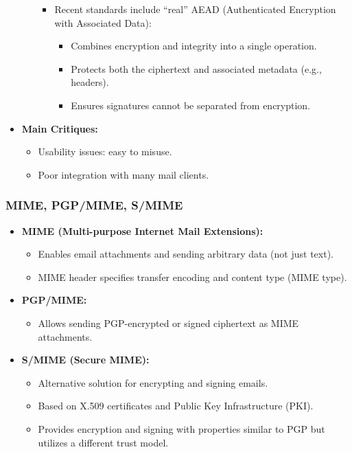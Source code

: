 \begin{itemize}
\begin{itemize}
\begin{itemize}
\begin{itemize}
            \end{itemize}
            \item Recent standards include ``real'' AEAD (Authenticated Encryption with Associated Data):
            \begin{itemize}
                \item Combines encryption and integrity into a single operation.
                \item Protects both the ciphertext and associated metadata (e.g., headers).
                \item Ensures signatures cannot be separated from encryption.
            \end{itemize}
        \end{itemize}
    \end{itemize}
    
    \item \textbf{Main Critiques:}
    \begin{itemize}
        \item Usability issues: easy to misuse.
        \item Poor integration with many mail clients.
    \end{itemize}
\end{itemize}

\subsubsection{MIME, PGP/MIME, S/MIME}
\begin{itemize}
    \item \textbf{MIME (Multi-purpose Internet Mail Extensions):}
    \begin{itemize}
        \item Enables email attachments and sending arbitrary data (not just text).
        \item MIME header specifies transfer encoding and content type (MIME type).
    \end{itemize}
    \item \textbf{PGP/MIME:}
    \begin{itemize}
        \item Allows sending PGP-encrypted or signed ciphertext as MIME attachments.
    \end{itemize}
    \item \textbf{S/MIME (Secure MIME):}
    \begin{itemize}
        \item Alternative solution for encrypting and signing emails.
        \item Based on X.509 certificates and Public Key Infrastructure (PKI).
        \item Provides encryption and signing with properties similar to PGP but utilizes a different trust model.
    \end{itemize}
\end{itemize}

